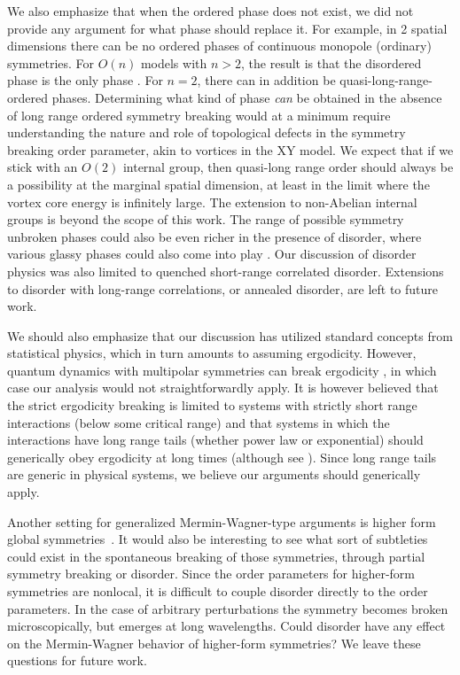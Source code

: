 \documentclass[prb,aps,twocolumn, amsfonts,amsmath,amssymb,nofootinbib,superscriptaddress]{revtex4-2}
\begin{document}
We also emphasize that when the ordered phase does not exist, we did not provide any argument for what phase should replace it. For example, in 2 spatial dimensions there can be no ordered phases of continuous monopole (ordinary) symmetries. For $O(n)$ models with $n>2$, the result is that the disordered phase is the only phase \cite{polyakov}. For $n=2$, there can in addition be quasi-long-range-ordered phases. Determining what kind of phase {\it can} be obtained in the absence of long range ordered symmetry breaking would at a minimum require understanding the nature and role of topological defects in the symmetry breaking order parameter, akin to vortices in the XY model. We expect that if we stick with an $O(2)$ internal group, then quasi-long range order should always be a possibility at the marginal spatial dimension, at least in the limit where the vortex core energy is infinitely large. The extension to non-Abelian internal groups is beyond the scope of this work. 
The range of possible symmetry unbroken phases could also be even richer in the presence of disorder, where various glassy phases could also come into play \cite{Fisheretal}. Our discussion of disorder physics was also limited to quenched short-range correlated disorder. Extensions to disorder with long-range correlations, or annealed disorder, are left to future work.

We should also emphasize that our discussion has utilized standard concepts from statistical physics, which in turn amounts to assuming ergodicity. However, quantum dynamics with multipolar symmetries can break ergodicity \cite{KHN, Sala}, in which case our analysis would not straightforwardly apply. It is however believed that the strict ergodicity breaking is limited to systems with strictly short range interactions (below some critical range) and that systems in which the interactions have long range tails (whether power law or exponential) should generically obey ergodicity at long times (although see \cite{NS}). Since long range tails are generic in physical systems, we believe our arguments should generically apply.  

Another setting for generalized Mermin-Wagner-type arguments is higher form global symmetries~\cite{GKSW, Lake, Marvin}. It would also be interesting to see what sort of subtleties could exist in the spontaneous breaking of those symmetries, through partial symmetry breaking or disorder. Since the order parameters for higher-form symmetries are nonlocal, it is difficult to couple disorder directly to the order parameters. In the case of arbitrary perturbations the symmetry becomes broken microscopically, but emerges at long wavelengths. Could disorder have any effect on the Mermin-Wagner behavior of higher-form symmetries? We leave these questions for future work. 
\end{document}
